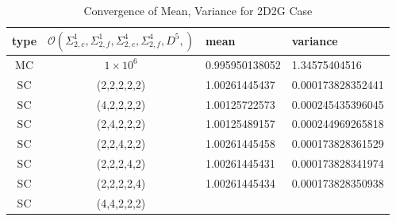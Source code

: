 \begin{table}[H]
\begin{center}
\begin{tabular}{c c|l l}
type & $\mathcal{O}(\Sigma_{2,c}^1,\Sigma_{2,f}^1,\Sigma_{2,c}^4,\Sigma_{2,f}^4,D^5,)$ & mean & variance \\ \hline
MC & $1\times10^6$ & 0.995950138052 & 1.34575404516 \\
SC & (2,2,2,2,2)  & 1.00261445437 & 0.000173828352441 \\
SC & (4,2,2,2,2)  & 1.00125722573 & 0.000245435396045 \\
SC & (2,4,2,2,2)  & 1.00125489157 & 0.000244969265818 \\
SC & (2,2,4,2,2)  & 1.00261445458 & 0.000173828361529 \\
SC & (2,2,2,4,2)  & 1.00261445431 & 0.000173828341974 \\
SC & (2,2,2,2,4)  & 1.00261445434 & 0.000173828350938 \\
SC & (4,4,2,2,2)  &  & 
\end{tabular}
\end{center}
\caption{Convergence of Mean, Variance for 2D2G Case}
\label{tab:2dcrit}
\end{table}
%
%
